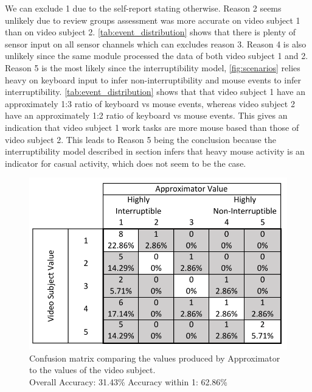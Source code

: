 \documentclass{sigchi}
\begin{document}
We can exclude 1 due to the self-report stating otherwise.
Reason 2 seems unlikely due to review groups assessment was more accurate on video subject 1 than on video subject 2.
\autoref{tab:event_distribution} shows that there is plenty of sensor input on all sensor channels which can excludes reason 3.
Reason 4 is also unlikely since the same module processed the data of both video subject 1 and 2.
Reason 5 is the most likely since the interruptibility model, \autoref{fig:scenarios} relies heavy on keyboard input to infer non-interruptibility and mouse events to infer interruptibility.
\autoref{tab:event_distribution} shows that that video subject 1 have an approximately 1:3 ratio of keyboard vs mouse events, whereas video subject 2 have an approximately 1:2 ratio of keyboard vs mouse events.
This gives an indication that video subject 1 work tasks are more mouse based than those of video subject 2.
This leads to Reason 5 being the conclusion because the interruptibility model described in section  infers that heavy mouse activity is an indicator for casual activity, which does not seem to be the case.

\begin{figure}[h]
  \centering
  \includegraphics[width=\columnwidth]{figures/VideoToApproximatorConfusionMatrix.pdf}
  \caption{Confusion matrix comparing the values produced by Approximator to the values of the video subject. \\Overall Accuracy: 31.43\% Accuracy within 1: 62.86\%}
  \label{fig:video_to_approximator_matrix}
\end{figure}
\end{document}
